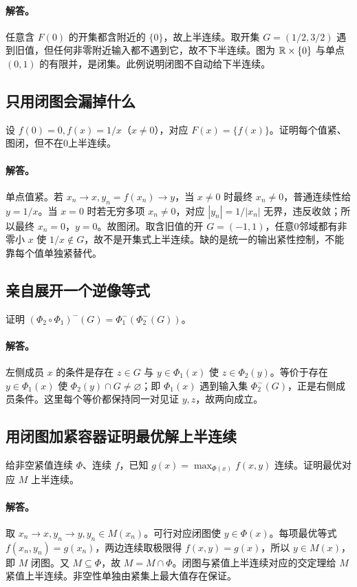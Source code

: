 \paragraph{解答。}任意含 $F(0)$ 的开集都含附近的 $\{0\}$，故上半连续。取开集 $G=(1/2,3/2)$ 遇到旧值，但任何非零附近输入都不遇到它，故不下半连续。图为 $\mathbb{R}\times\{0\}$ 与单点 $(0,1)$ 的有限并，是闭集。此例说明闭图不自动给下半连续。
\subsection{只用闭图会漏掉什么}
设 $f(0)=0,f(x)=1/x$（$x\ne0$），对应 $F(x)=\{f(x)\}$。证明每个值紧、图闭，但不在0上半连续。
\paragraph{解答。}单点值紧。若 $x_n\to x,y_n=f(x_n)\to y$，当 $x\ne0$ 时最终 $x_n\ne0$，普通连续性给 $y=1/x$。当 $x=0$ 时若无穷多项 $x_n\ne0$，对应 $|y_n|=1/|x_n|$ 无界，违反收敛；所以最终 $x_n=0$，$y=0$。故图闭。取含旧值的开 $G=(-1,1)$，任意0邻域都有非零小 $x$ 使 $1/x\notin G$，故不是开集式上半连续。缺的是统一的输出紧性控制，不能靠每个值单独紧替代。
\subsection{亲自展开一个逆像等式}
证明 $(\Phi_2\circ\Phi_1)^-(G)=\Phi_1^-(\Phi_2^-(G))$。
\paragraph{解答。}左侧成员 $x$ 的条件是存在 $z\in G$ 与 $y\in\Phi_1(x)$ 使 $z\in\Phi_2(y)$。等价于存在 $y\in\Phi_1(x)$ 使 $\Phi_2(y)\cap G\ne\varnothing$；即 $\Phi_1(x)$ 遇到输入集 $\Phi_2^-(G)$，正是右侧成员条件。这里每个等价都保持同一对见证 $y,z$，故两向成立。
\subsection{用闭图加紧容器证明最优解上半连续}
给非空紧值连续 $\Phi$、连续 $f$，已知 $g(x)=\max_{\Phi(x)}f(x,y)$ 连续。证明最优对应 $M$ 上半连续。
\paragraph{解答。}取 $x_n\to x,y_n\to y,y_n\in M(x_n)$。可行对应闭图使 $y\in\Phi(x)$。每项最优等式 $f(x_n,y_n)=g(x_n)$，两边连续取极限得 $f(x,y)=g(x)$，所以 $y\in M(x)$，即 $M$ 闭图。又 $M\subseteq\Phi$，故 $M=M\cap\Phi$。闭图与紧值上半连续对应的交定理给 $M$ 紧值上半连续。非空性单独由紧集上最大值存在保证。
